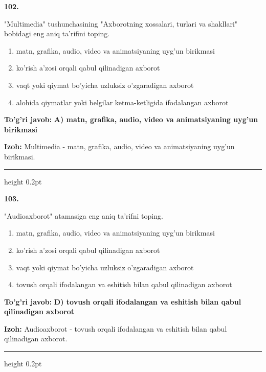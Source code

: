 \documentclass[10pt,a4paper,oneside]{article}
\begin{document}
\noindent\textbf{\color{ink}102.}
\par
"Multimedia" tushunchasining "Axborotning xossalari, turlari va shakllari" bobidagi eng aniq ta'rifini toping.
\begin{enumerate}[label=\Alph*),leftmargin=9mm]
\item matn, grafika, audio, video va animatsiyaning uyg'un birikmasi
\item ko'rish a'zosi orqali qabul qilinadigan axborot
\item vaqt yoki qiymat bo'yicha uzluksiz o'zgaradigan axborot
\item alohida qiymatlar yoki belgilar ketma-ketligida ifodalangan axborot
\end{enumerate}
\begin{tcolorbox}[enhanced,breakable,colback=teal!4,colframe=teal!50!black,boxrule=0.5pt,arc=1.1mm,left=3mm,right=3mm,top=1.7mm,bottom=1.7mm,before skip=2mm,after skip=2mm]
\textbf{\color{teal}To'g'ri javob:} \textbf{A) matn, grafika, audio, video va animatsiyaning uyg'un birikmasi}
\par\smallskip
\textbf{Izoh:} Multimedia - matn, grafika, audio, video va animatsiyaning uyg'un birikmasi.
\end{tcolorbox}
\vspace{2mm}\hrule height 0.2pt \vspace{3mm}

\noindent\textbf{\color{ink}103.}
\par
"Audioaxborot" atamasiga eng aniq ta'rifni toping.
\begin{enumerate}[label=\Alph*),leftmargin=9mm]
\item matn, grafika, audio, video va animatsiyaning uyg'un birikmasi
\item ko'rish a'zosi orqali qabul qilinadigan axborot
\item vaqt yoki qiymat bo'yicha uzluksiz o'zgaradigan axborot
\item tovush orqali ifodalangan va eshitish bilan qabul qilinadigan axborot
\end{enumerate}
\begin{tcolorbox}[enhanced,breakable,colback=teal!4,colframe=teal!50!black,boxrule=0.5pt,arc=1.1mm,left=3mm,right=3mm,top=1.7mm,bottom=1.7mm,before skip=2mm,after skip=2mm]
\textbf{\color{teal}To'g'ri javob:} \textbf{D) tovush orqali ifodalangan va eshitish bilan qabul qilinadigan axborot}
\par\smallskip
\textbf{Izoh:} Audioaxborot - tovush orqali ifodalangan va eshitish bilan qabul qilinadigan axborot.
\end{tcolorbox}
\vspace{2mm}\hrule height 0.2pt \vspace{3mm}
\end{document}
